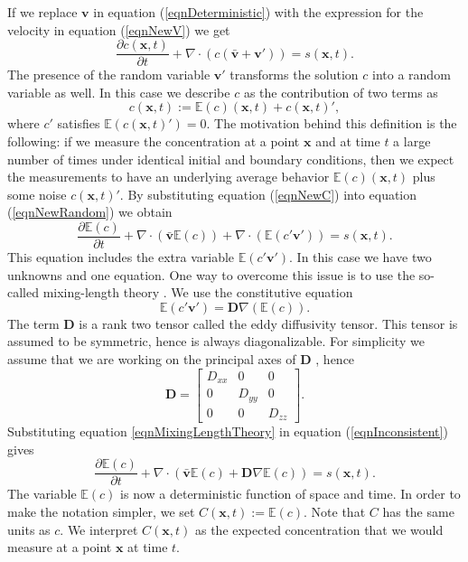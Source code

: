 \documentclass{sfuthesis}
\newcommand{\E}{\mathbb{E}} %
\newcommand{\x}{\textbf{x}}
\newcommand{\vv}{\textbf{v}}
\newcommand{\dv}{\nabla\cdot}
\begin{document}
If we replace $\vv$ in equation (\ref{eqnDeterministic}) with the expression for the velocity
in equation (\ref{eqnNewV}) we get
\begin{equation}\label{eqnNewRandom}
\frac{\partial c(\x,t)}{\partial t}+\nabla\cdot(c(\bar{\textbf{v}}+\vv'))=s(\x,t).
\end{equation}
The presence of the random variable $\vv'$ transforms the solution $c$ into a random 
variable as well. In this case we describe $c$ as the contribution of two terms as 
\begin{equation}\label{eqnNewC}
c(\x,t):=\E(c)(\x,t)+c(\x,t)',
\end{equation}
where $c'$ satisfies $\E(c(\x,t)')=0$. The motivation behind this definition is the following: if we 
 measure the concentration at a point $\x$ and at time $t$ a large number of times under identical initial and boundary conditions,  then we expect the 
measurements to have an underlying average behavior $\E(c)(\x,t)$ plus some  noise $c(\x,t)'$.
By substituting   equation (\ref{eqnNewC}) into equation (\ref{eqnNewRandom}) we obtain
\begin{equation}\label{eqnInconsistent}
\frac{\partial\E(c)}{\partial t}+\dv(\bar{\vv}\E(c))+\dv(\E(c'\vv'))=s(\x,t).
\end{equation}
This equation includes  the extra variable $\E(c'\vv')$.
In this case we have two unknowns and one equation. 
One way to overcome this issue is to use the so-called mixing-length theory \cite{seinfeld1998atmospheric}. 
We use the constitutive equation
\begin{equation}\label{eqnMixingLengthTheory}
\E(c'\vv')=\textbf{D}\nabla(\E(c)).
\end{equation}
The term $\textbf{D}$ is  a rank two tensor called the eddy diffusivity tensor. This tensor is assumed 
to be symmetric, hence is always diagonalizable. For simplicity we assume that we are working
on the principal axes of $\textbf{D}$ \cite{seinfeld1998atmospheric}, hence 
\begin{equation*}
\textbf{D}=\begin{bmatrix}
D_{xx}& 0 & 0\\
0 & D_{yy} & 0\\
0 & 0 & D_{zz}
\end{bmatrix}.
\end{equation*}
Substituting equation \eqref{eqnMixingLengthTheory} in equation (\ref{eqnInconsistent}) gives
\begin{equation}\label{eqnfirstDifferentialForm}
\frac{\partial\E(c)}{\partial t}+\dv(\bar{\vv}\E(c)+\textbf{D}\nabla\E(c))=s(\x,t).
\end{equation}
The variable $\E(c)$ is now a  deterministic function of space and time. In order to make the
notation simpler,  we set $C(\x,t):=\E(c)$. Note that $C$ has the same units
as $c$. We interpret $C(\x,t)$ as the expected concentration that we would measure
at a point $\x$ at time $t$.
\end{document}
